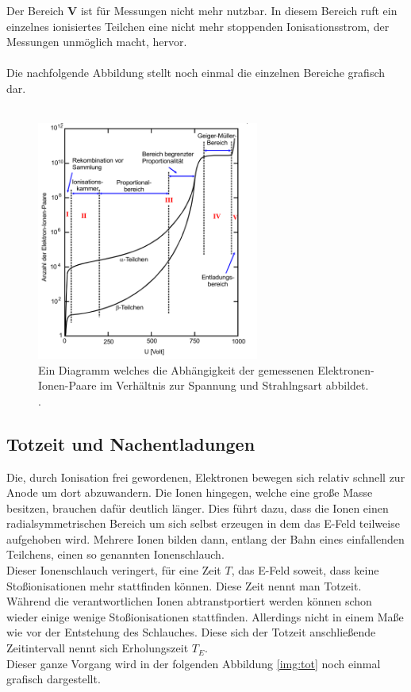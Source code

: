\noindent Der Bereich \textbf{V} ist für Messungen nicht mehr nutzbar. In diesem Bereich ruft ein einzelnes ionisiertes Teilchen eine nicht mehr stoppenden Ionisationsstrom, der Messungen unmöglich macht, hervor.\\\\
Die nachfolgende Abbildung stellt noch einmal die einzelnen Bereiche grafisch dar.\\\\

\begin{figure}[H]
    \centering
    \includegraphics[width=0.65\textwidth]{images/Spannungsgrafik.PNG}
    \caption{Ein Diagramm welches die Abhängigkeit der gemessenen Elektronen-Ionen-Paare im Verhältnis zur Spannung und Strahlngsart abbildet. \protect \cite{V703}.}
    \label{img:spannung}
\end{figure}


\subsection{Totzeit und Nachentladungen}


\noindent
Die, durch Ionisation frei gewordenen, Elektronen bewegen sich relativ schnell zur Anode um dort abzuwandern. Die Ionen hingegen, welche eine große Masse besitzen, brauchen dafür deutlich länger.
Dies führt dazu, dass die Ionen einen radialsymmetrischen Bereich um sich selbst erzeugen in dem das E-Feld teilweise aufgehoben wird. 
Mehrere Ionen bilden dann, entlang der Bahn eines einfallenden Teilchens, einen so genannten Ionenschlauch.\\
Dieser Ionenschlauch veringert, für eine Zeit $T$, das E-Feld soweit, dass keine Stoßionisationen mehr stattfinden können. Diese Zeit nennt man Totzeit.\\
Während die verantwortlichen Ionen abtranstportiert werden können schon wieder einige wenige Stoßionisationen stattfinden. 
Allerdings nicht in einem Maße wie vor der Entstehung des Schlauches. Diese sich der Totzeit anschließende Zeitintervall nennt sich Erholungszeit $T_E$.\\
Dieser ganze Vorgang wird in der folgenden Abbildung \ref{img:tot} noch einmal grafisch dargestellt.

